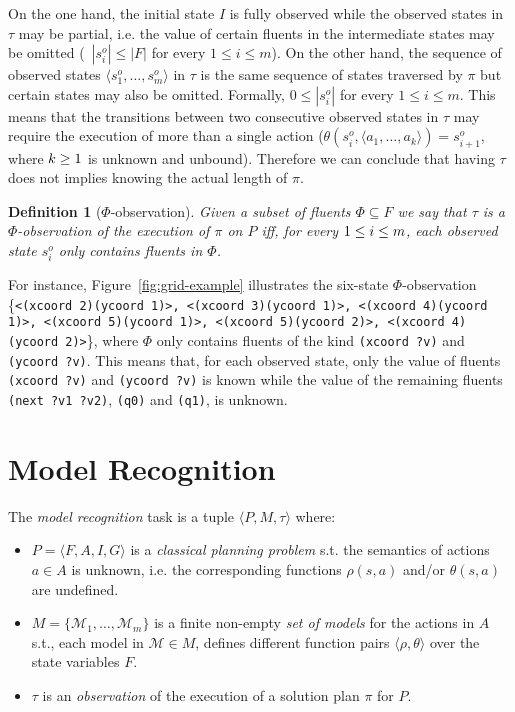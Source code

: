 \documentclass[letterpaper]{article} %
\newcommand{\tup}[1]{{\langle #1 \rangle}}
\newtheorem{definition}[theorem]{Definition}
\begin{document}
On the one hand, the initial state $I$ is fully observed while the observed states in $\tau$ may be partial, i.e. the value of certain fluents in the intermediate states may be omitted (~$|s_i^o|\leq |F|$ for every $1\leq i\leq m$). On the other hand, the sequence of observed states $\tup{s_1^o, \ldots, s_m^o}$ in $\tau$ is the same sequence of states traversed by $\pi$ but certain states may also be omitted. Formally, $0\leq|s_i^o|$ for every $1\leq i\leq m$. This means that the transitions between two consecutive observed states in $\tau$ may require the execution of more than a single action ($\theta(s_i^o,\tup{a_1,\ldots,a_k})=s_{i+1}^o$, where ${\small k\geq 1}$ is unknown and unbound). Therefore we can conclude that having $\tau$ does not implies knowing the actual length of $\pi$.

\begin{definition}[$\Phi$-observation]
Given a subset of fluents $\Phi\subseteq F$ we say that $\tau$ is a $\Phi$-observation of the execution of $\pi$ on $P$ iff, for every ${\small 1\leq i\leq m}$, each observed state $s_i^o$ only contains fluents in $\Phi$.
\end{definition}

For instance, Figure~\ref{fig:grid-example} illustrates the six-state $\Phi$-observation \{{\tt\footnotesize<(xcoord 2)(ycoord 1)>, <(xcoord 3)(ycoord 1)>, <(xcoord 4)(ycoord 1)>, <(xcoord 5)(ycoord 1)>, <(xcoord 5)(ycoord 2)>, <(xcoord 4)(ycoord 2)>}\}, where $\Phi$ only contains fluents of the kind {\tt\small (xcoord ?v)} and {\tt\small (ycoord ?v)}. This means that, for each observed state, only the value of fluents {\tt\small (xcoord ?v)} and {\tt\small (ycoord ?v)} is known while the value of the remaining fluents {\tt\small (next ?v1 ?v2)}, {\tt\small (q0)} and {\tt\small (q1)}, is unknown.



\section{Model Recognition}
\label{sec:recognition}
The {\em model recognition} task is a tuple $\tup{P,M,\tau}$ where:
\begin{itemize}
\item $P=\tup{F,A,I,G}$ is a {\em classical planning problem} s.t. the semantics of actions $a\in A$ is unknown, i.e. the corresponding functions $\rho(s,a)$ and/or $\theta(s,a)$ are undefined.
\item $M=\{\mathcal{M}_1,\ldots,\mathcal{M}_m\}$ is a finite non-empty {\em set of models} for the actions in $A$ s.t., each model in $\mathcal{M}\in M$, defines different function pairs $\tup{\rho,\theta}$ over the state variables $F$.
\item $\tau$ is an {\em observation} of the execution of a solution plan $\pi$ for $P$.
\end{itemize}
\end{document}
